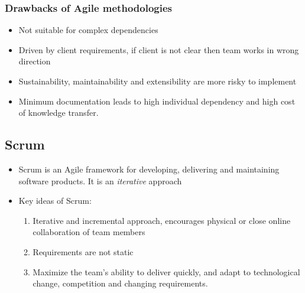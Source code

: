 \documentclass{article}
\begin{document}
\subsubsection{Drawbacks of Agile methodologies}
\begin{itemize}
    \item Not suitable for complex dependencies
    
    \item Driven by client requirements, if client is not clear then team works in wrong direction
    
    \item Sustainability, maintainability and extensibility are more risky to implement
    
    \item Minimum documentation leads to high individual dependency and high cost of knowledge transfer. 
\end{itemize}

\subsection{Scrum}
\begin{itemize}
    \item Scrum is an Agile framework for developing, delivering and maintaining software products. It is an \textit{iterative} approach
    
    \item Key ideas of Scrum:
    \begin{enumerate}
        \item Iterative and incremental approach, encourages physical or close online collaboration of team members 
        
        \item Requirements are not static
        
        \item Maximize the team's ability to deliver quickly, and adapt to technological change, competition and changing requirements.
    \end{enumerate}
\end{itemize}
\end{document}
